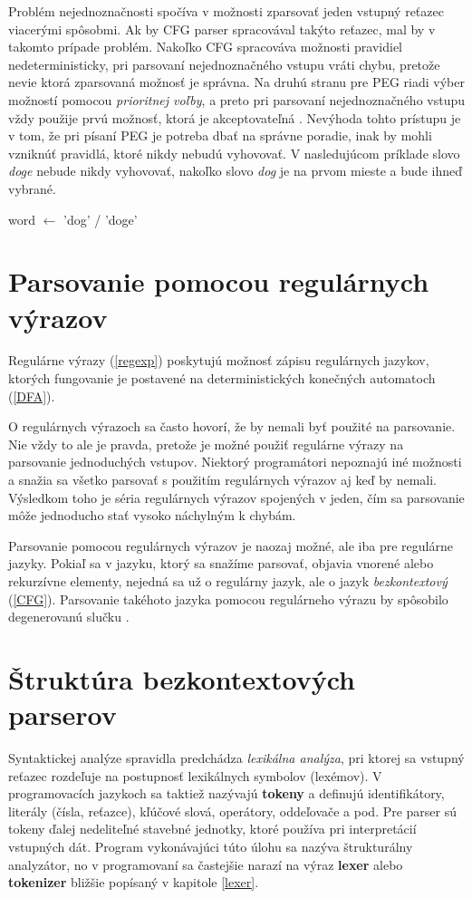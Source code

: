 Problém nejednoznačnosti spočíva v možnosti zparsovať jeden vstupný reťazec viacerými spôsobmi. Ak by CFG parser spracovával takýto reťazec, mal by v takomto prípade problém. Nakoľko CFG spracováva možnosti pravidiel nedeterministicky, pri parsovaní nejednoznačného vstupu vráti chybu, pretože nevie ktorá zparsovaná možnosť je správna. Na druhú stranu pre PEG riadi výber možností pomocou \textit{prioritnej voľby}, a preto pri parsovaní nejednoznačného vstupu vždy použije prvú možnosť, ktorá je akceptovateľná \cite{ford2004parsing}. Nevýhoda tohto prístupu je v tom, že pri písaní PEG je potreba dbať na správne poradie, inak by mohli vzniknúť pravidlá, ktoré nikdy nebudú vyhovovať. V nasledujúcom príklade slovo \textit{doge} nebude nikdy vyhovovať, nakoľko slovo \textit{dog} je na prvom mieste a bude ihneď vybrané.

\begin{center}
word $\leftarrow$ 'dog' / 'doge'
\end{center}

\section{Parsovanie pomocou regulárnych výrazov}
Regulárne výrazy (\ref{regexp}) poskytujú možnosť zápisu regulárnych jazykov, ktorých fungovanie je postavené na deterministických konečných automatoch (\ref{DFA}).

O regulárnych výrazoch sa často hovorí, že by nemali byť použité na parsovanie. Nie vždy to ale je pravda, pretože je možné použiť regulárne výrazy na parsovanie jednoduchých vstupov. Niektorý programátori nepoznajú iné možnosti a snažia sa všetko parsovať s použitím regulárnych výrazov aj keď by nemali. Výsledkom toho je séria regulárnych výrazov spojených v jeden, čím sa parsovanie môže jednoducho stať vysoko náchylným k chybám.

Parsovanie pomocou regulárnych výrazov je naozaj možné, ale iba pre regulárne jazyky. Pokiaľ sa v jazyku, ktorý sa snažíme parsovať, objavia vnorené alebo rekurzívne elementy, nejedná sa už o regulárny jazyk, ale o jazyk \textit{bezkontextový} (\ref{CFG}). Parsovanie takéhoto jazyka pomocou regulárneho výrazu by spôsobilo degenerovanú slučku \cite{ford2004parsing}. 

\section{Štruktúra bezkontextových parserov}
Syntaktickej analýze spravidla predchádza \textit{lexikálna analýza}, pri ktorej sa vstupný reťazec rozdeľuje na postupnosť lexikálnych symbolov (lexémov). V programovacích jazykoch sa taktiež nazývajú \textbf{tokeny} a definujú identifikátory, literály (čísla, reťazce), kľúčové slová, operátory, oddeľovače a pod. Pre parser sú tokeny ďalej nedeliteľné stavebné jednotky, ktoré používa pri interpretácií vstupných dát. Program vykonávajúci túto úlohu sa nazýva štrukturálny analyzátor, no v programovaní sa častejšie narazí na výraz \textbf{lexer} alebo \textbf{tokenizer} bližšie popísaný v kapitole \ref{lexer}. 

